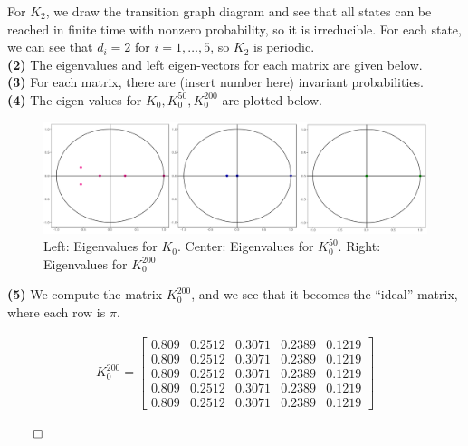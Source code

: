 \documentclass[5pt]{article}
\begin{document}
For $K_2$, we draw the transition graph diagram and see that all states can be reached in finite time with nonzero probability, so it is irreducible. For each state, we can see that $d_i = 2$ for $i = 1, \ldots, 5$, so $K_2$ is periodic. \\

\textbf{(2)} The eigenvalues and left eigen-vectors for each matrix are given below. \\


\textbf{(3)} For each matrix, there are (insert number here) invariant probabilities. \\


\textbf{(4)} The eigen-values for $K_0, K_0^{50}, K_{0}^{200}$ are plotted below. \\

\begin{figure}[H]
\begin{center}
\includegraphics[width = 1 \columnwidth]{eigen_values}
\caption{Left: Eigenvalues for $K_0$. Center: Eigenvalues for $K_0^{50}$. Right: Eigenvalues for $K_0^{200}$}
\end{center}
\end{figure}


\textbf{(5)} We compute the matrix $K_0^{200}$, and we see that it becomes the ``ideal'' matrix, where each row is $\pi$.

\begin{align*}
K_0^{200} = 
	\begin{bmatrix}
		0.809 & 0.2512 & 0.3071 & 0.2389 & 0.1219 \\		
		0.809 & 0.2512 & 0.3071 & 0.2389 & 0.1219 \\	
		0.809 & 0.2512 & 0.3071 & 0.2389 & 0.1219 \\	
		0.809 & 0.2512 & 0.3071 & 0.2389 & 0.1219 \\	
		0.809 & 0.2512 & 0.3071 & 0.2389 & 0.1219
	\end{bmatrix}
\end{align*}

\hfill $\qed$

\pagebreak
\end{document}
